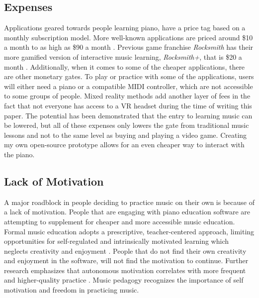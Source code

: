 \documentclass[10pt,twocolumn]{article}
\begin{document}
\subsection{Expenses}
Applications geared towards people learning piano, have a price tag based on a monthly subscription model. More well-known applications are priced around \$10 a month to as high as \$90 a month \cite{SkoovePianoApps}. Previous game franchise \textit{Rocksmith} has their more gamified version of interactive music learning, \textit{Rocksmith+}, that is \$20 a month \cite{Rocksmith+}. Additionally, when it comes to some of the cheaper applications, there are other monetary gates. To play or practice with some of the applications, users will either need a piano or a compatible MIDI controller, which are not accessible to some groups of people. Mixed reality methods add another layer of fees in the fact that not everyone has access to a VR headset during the time of writing this paper. The potential has been demonstrated that the entry to learning music can be lowered, but all of these expenses only lowers the gate from traditional music lessons and not to the same level as buying and playing a video game. Creating my own open-source prototype allows for an even cheaper way to interact with the piano. 

\subsection{Lack of Motivation}
A major roadblock in people deciding to practice music on their own is because of a lack of motivation. People that are engaging with piano education software are attempting to supplement for cheaper and more accessible music education. Formal music education adopts a prescriptive, teacher-centered approach, limiting opportunities for self-regulated and intrinsically motivated learning which neglects creativity and enjoyment \cite{MotivationAndSelf-RegulationinMusicLearning}. People that do not find their own creativity and enjoyment in the software, will not find the motivation to continue. Further research emphasizes that autonomous motivation correlates with more frequent and higher-quality practice \cite{Self-DeterminedMotivationforPractice}. Music pedagogy recognizes the importance of self motivation and freedom in practicing music. 
\end{document}
